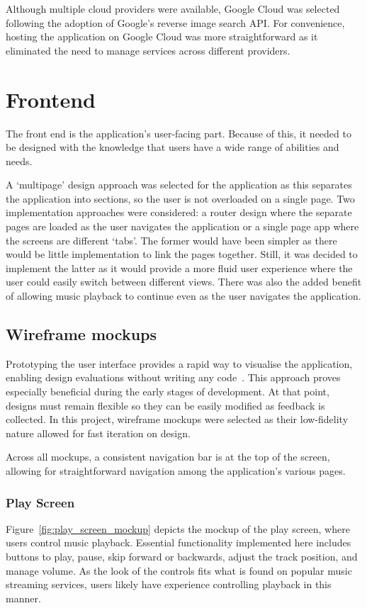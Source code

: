 Although multiple cloud providers were available, Google Cloud was selected following the adoption of Google's reverse image search API. For convenience, hosting the application on Google Cloud was more straightforward as it eliminated the need to manage services across different providers.

\section{Frontend}
The front end is the application's user-facing part. Because of this, it needed to be designed with the knowledge that users have a wide range of abilities and needs.

A `multipage' design approach was selected for the application as this separates the application into sections, so the user is not overloaded on a single page. Two implementation approaches were considered: a router design where the separate pages are loaded as the user navigates the application or a single page app where the screens are different `tabs'. The former would have been simpler as there would be little implementation to link the pages together. Still, it was decided to implement the latter as it would provide a more fluid user experience where the user could easily switch between different views. There was also the added benefit of allowing music playback to continue even as the user navigates the application.

\subsection{Wireframe mockups}
Prototyping the user interface provides a rapid way to visualise the application, enabling design evaluations without writing any code~\cite{WILSON1988859}. This approach proves especially beneficial during the early stages of development. At that point, designs must remain flexible so they can be easily modified as feedback is collected. In this project, wireframe mockups were selected as their low-fidelity nature allowed for fast iteration on design.

Across all mockups, a consistent navigation bar is at the top of the screen, allowing for straightforward navigation among the application's various pages.

\subsubsection{Play Screen}
Figure~\ref{fig:play_screen_mockup} depicts the mockup of the play screen, where users control music playback. Essential functionality implemented here includes buttons to play, pause, skip forward or backwards, adjust the track position, and manage volume. As the look of the controls fits what is found on popular music streaming services, users likely have experience controlling playback in this manner.

